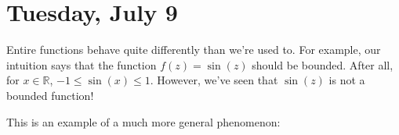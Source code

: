 \section{Tuesday, July 9}


Entire functions behave quite differently than we're used to. For example, our intuition says that the function $f(z) = \sin(z)$ should be bounded. After all, for $x \in \mathbb{R}$, $-1 \le \sin(x) \le 1$. However, we've seen that $\sin(z)$ is not a bounded function!

This is an example of a much more general phenomenon:

